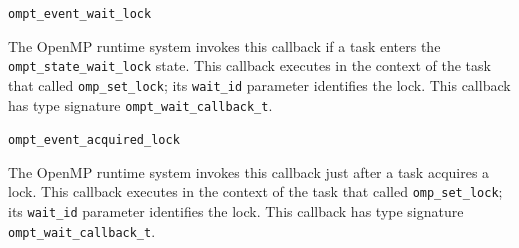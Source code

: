 \documentclass{article}
\newcommand{\descheader}[1]{{\needspace{3\baselineskip}\vspace{1em}\noindent \fbox{#1}}}
\begin{document}
\begin{description}

\item \verb|ompt_event_wait_lock| 
 
   The OpenMP runtime system invokes this callback if a task
   enters the \verb|ompt_state_wait_lock| 
   state.  This callback executes in the context of the task that called \verb|omp_set_lock|;
   its \verb|wait_id| parameter identifies the lock.
   This callback has type signature \verb|ompt_wait_callback_t|. 

\item \verb|ompt_event_acquired_lock| 
 
   The OpenMP runtime system invokes this callback just after a
   task acquires a lock.  This callback executes in the
   context of the task that called \verb|omp_set_lock|; its \verb|wait_id| parameter identifies the  %
   lock.
   This callback  has type signature \verb|ompt_wait_callback_t|.

\end{description}

\descheader{Nest Locks}
\end{document}
